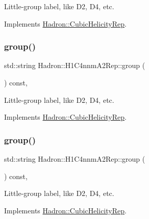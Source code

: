 Little-\/group label, like D2, D4, etc. 

Implements \mbox{\hyperlink{structHadron_1_1CubicHelicityRep_a101a7d76cd8ccdad0f272db44b766113}{Hadron\+::\+Cubic\+Helicity\+Rep}}.

\mbox{\label{structHadron_1_1H1C4nnmA2Rep_a618b727c856720ba9e2828e3485f6733}} 
\subsubsection{\texorpdfstring{group()}{group()}\hspace{0.1cm}{\footnotesize\ttfamily [2/3]}}
{\footnotesize\ttfamily std\+::string Hadron\+::\+H1\+C4nnm\+A2\+Rep\+::group (\begin{DoxyParamCaption}{ }\end{DoxyParamCaption}) const\hspace{0.3cm}{\ttfamily [inline]}, {\ttfamily [virtual]}}

Little-\/group label, like D2, D4, etc. 

Implements \mbox{\hyperlink{structHadron_1_1CubicHelicityRep_a101a7d76cd8ccdad0f272db44b766113}{Hadron\+::\+Cubic\+Helicity\+Rep}}.

\mbox{\label{structHadron_1_1H1C4nnmA2Rep_a618b727c856720ba9e2828e3485f6733}} 
\subsubsection{\texorpdfstring{group()}{group()}\hspace{0.1cm}{\footnotesize\ttfamily [3/3]}}
{\footnotesize\ttfamily std\+::string Hadron\+::\+H1\+C4nnm\+A2\+Rep\+::group (\begin{DoxyParamCaption}{ }\end{DoxyParamCaption}) const\hspace{0.3cm}{\ttfamily [inline]}, {\ttfamily [virtual]}}

Little-\/group label, like D2, D4, etc. 

Implements \mbox{\hyperlink{structHadron_1_1CubicHelicityRep_a101a7d76cd8ccdad0f272db44b766113}{Hadron\+::\+Cubic\+Helicity\+Rep}}.

